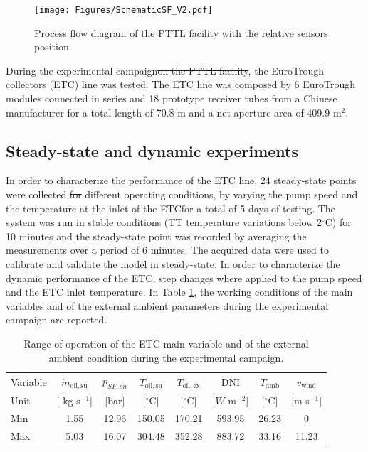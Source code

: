\documentclass[final,3p,times,review]{elsarticle}
\providecommand{\DIFadd}[1]{{\protect\color{blue}\uwave{#1}}} %
\providecommand{\DIFdel}[1]{{\protect\color{red}\sout{#1}}}                      %
\providecommand{\DIFaddbegin}{} %
\providecommand{\DIFaddend}{} %
\providecommand{\DIFdelbegin}{} %
\providecommand{\DIFdelend}{} %
\providecommand{\DIFaddFL}[1]{\DIFadd{#1}} %
\providecommand{\DIFdelFL}[1]{\DIFdel{#1}} %
\providecommand{\DIFaddbeginFL}{} %
\providecommand{\DIFaddendFL}{} %
\providecommand{\DIFdelbeginFL}{} %
\providecommand{\DIFdelendFL}{} %
\begin{document}
%
\begin{figure}[h!]
\centering
\texttt{[image: Figures/SchematicSF\_V2.pdf]}
\caption{Process flow diagram of the \DIFdelbeginFL \DIFdelFL{PTTL }\DIFdelendFL \DIFaddbeginFL \DIFaddFL{HTF }\DIFaddendFL facility with the relative sensors position.}
\label{fig:PTTL_PI}
\end{figure}
%
During the experimental campaign\DIFdelbegin \DIFdel{on the PTTL facility}\DIFdelend , the EuroTrough collectors (ETC) line was tested. The ETC line was composed by 6 EuroTrough modules connected in series and 18 prototype receiver tubes from a Chinese manufacturer for a total length of 70.8 m and a net aperture area of 409.9 m$^2$.
%
\subsection{Steady-state and dynamic experiments}
%
In order to characterize the performance of the ETC line, 24 steady-state points were collected \DIFdelbegin \DIFdel{for }\DIFdelend \DIFaddbegin \DIFadd{at }\DIFaddend different operating conditions, by varying the pump speed and the temperature at the inlet of the ETC\DIFaddbegin \DIFadd{, }\DIFaddend for a total of 5 days of testing. The system was run in stable conditions (TT temperature variations
below 2$^{\circ}$C) for 10 minutes and the steady-state point was recorded by averaging the measurements over a period of 6 minutes. The acquired data were used to calibrate and validate the model in steady-state.
In order to characterize the dynamic performance of the ETC, step changes where applied to the pump speed and the ETC inlet temperature. In Table \ref{Tab:SF_workCond}, the working conditions of the main variables and of the external ambient parameters during the experimental campaign are reported. 
%
\begin{table}[h!]
\centering
\caption{Range of operation of the ETC main variable and of the external ambient condition during the experimental campaign.}
\begin{tabular}{lccccccc}
\toprule
 Variable & $\dot{m}_\mathrm{oil,su}$ & $p_{SF,su}$  &$T_\mathrm{oil,su}$  & $T_\mathrm{oil,ex}$ &  DNI &  $T_\mathrm{amb}$ & $v_\mathrm{wind}$ \\
Unit &  [ kg s$^{-1}$] & [bar] & [$^{\circ}$C] &  [$^{\circ}$C]&  [$W$ m$^{-2}$] &  [$^{\circ}$C] &  [m s$^{-1}$] \\
\toprule
Min & 1.55      &   12.96 & 150.05  &   170.21  &   593.95  &   26.23 &   0  \\
Max & 5.03      &   16.07 & 304.48  &   352.28  &   883.72  &   33.16 &   11.23  \\
\bottomrule
\end{tabular}
\label{Tab:SF_workCond}
\end{table}
\end{document}
